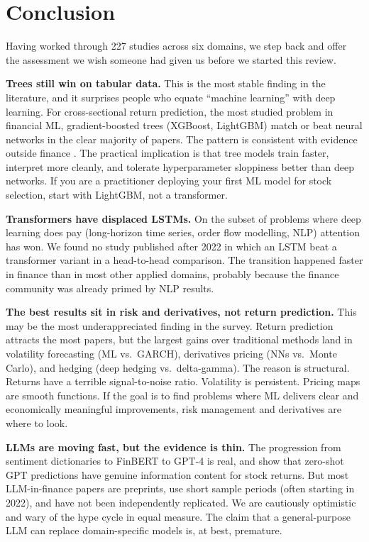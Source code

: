 \section{Conclusion}\label{sec:conclusion}

Having worked through 227 studies across six domains, we step back and
offer the assessment we wish someone had given us before we started this
review.

\textbf{Trees still win on tabular data.} This is the most stable finding
in the literature, and it surprises people who equate ``machine learning''
with deep learning. For cross-sectional return prediction, the most
studied problem in financial ML, gradient-boosted trees (XGBoost,
LightGBM) match or beat neural networks in the clear majority of papers.
The pattern is consistent with evidence outside finance
\citep{Grinsztajn2022}. The practical implication is that tree models
train faster, interpret more cleanly, and tolerate hyperparameter sloppiness
better than deep networks. If you are a practitioner deploying your first
ML model for stock selection, start with LightGBM, not a transformer.

\textbf{Transformers have displaced LSTMs.} On the subset of problems
where deep learning does pay (long-horizon time series, order flow
modelling, NLP) attention has won. We found no study published after 2022
in which an LSTM beat a transformer variant in a head-to-head comparison.
The transition happened faster in finance than in most other applied
domains, probably because the finance community was already primed by
NLP results.

\textbf{The best results sit in risk and derivatives, not return
prediction.} This may be the most underappreciated finding in the survey.
Return prediction attracts the most papers, but the largest gains over
traditional methods land in volatility forecasting (ML vs.\ GARCH),
derivatives pricing (NNs vs.\ Monte Carlo), and hedging (deep hedging
vs.\ delta-gamma). The reason is structural. Returns have a terrible
signal-to-noise ratio. Volatility is persistent. Pricing maps are smooth
functions. If the goal is to find problems where ML delivers clear and
economically meaningful improvements, risk management and derivatives are
where to look.

\textbf{LLMs are moving fast, but the evidence is thin.} The progression
from sentiment dictionaries to FinBERT to GPT-4 is real, and
\citet{LopezLira2023} show that zero-shot GPT predictions have genuine
information content for stock returns. But most LLM-in-finance papers are
preprints, use short sample periods (often starting in 2022), and have not
been independently replicated. We are cautiously optimistic and wary of
the hype cycle in equal measure. The claim that a general-purpose LLM can
replace domain-specific models is, at best, premature.

